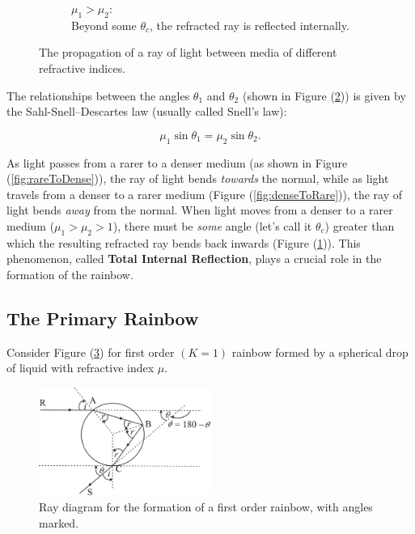 \begin{figure}[!htb]
\begin{subfigure}[b]{\textwidth}
                \caption{$\mu_1>\mu_2:$\\ Beyond some $\theta_c$, the refracted ray is reflected internally.}
                \label{fig:til}
        \end{subfigure}
        \caption{The propagation of a ray of light between media of different refractive indices.}\label{fig:snells}
\end{figure}


The relationships between the angles $\theta_1$ and $\theta_2$ (shown in Figure (\ref{fig:snells})) is given by the Sahl-Snell–Descartes law (usually called Snell's law):

 \begin{equation}
    \mu_1 \sin{\theta_1}= \mu_2 \sin{\theta_2}.
    \label{snell}
 \end{equation}

As light passes from a rarer to a denser medium (as shown in Figure (\ref{fig:rareToDense})), the ray of light bends \textit{towards} the normal, while as light travels from a denser to a rarer medium (Figure (\ref{fig:denseToRare})), the ray of light bends \textit{away} from the normal. When light moves from a denser to a rarer medium ($\mu_1>\mu_2>1$), there must be \textit{some} angle (let's call it $\theta_c$) greater than which the resulting refracted ray bends back inwards (Figure (\ref{fig:til})). This phenomenon, called \textbf{Total Internal Reflection}, plays a crucial role in the formation of the rainbow.



\subsection*{The Primary Rainbow}

Consider Figure (\ref{fig:firstorder1}) for first order $(K = 1)$ rainbow formed by a spherical drop of liquid with refractive index $\mu$.

\begin{figure}[!htb]
    \centering
    \includegraphics[width=0.5\textwidth]{figs/img3.jpg}
    \caption{Ray diagram for the formation of a first order rainbow, with angles marked.}
    \label{fig:firstorder1}
\end{figure}


